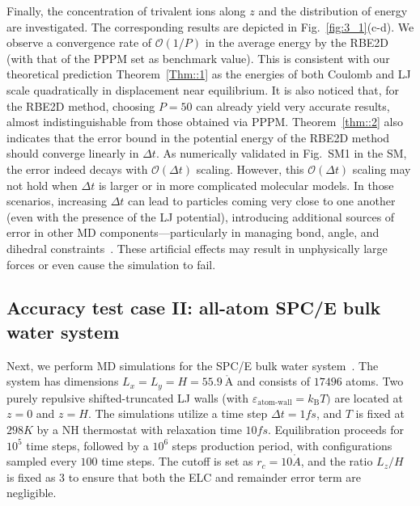 Finally, the concentration of trivalent ions along $z$ and the distribution of energy are investigated.
The corresponding results are depicted in Fig.~\ref{fig:3_1}(c-d). 
We observe a convergence rate of $\mathcal{O}(1/P)$ in the average energy by the RBE2D (with that of the PPPM set as benchmark value). 
This is consistent with our theoretical prediction Theorem~\ref{Thm::1} as the energies of both Coulomb and LJ scale quadratically in displacement near equilibrium.
It is also noticed that, for the RBE2D method, choosing $P=50$ can already yield very accurate results, almost indistinguishable from those obtained via PPPM. 
 {Theorem~\ref{thm::2} also indicates that the error bound in the potential energy of the RBE2D method should converge linearly in $\Delta t$. As numerically validated in Fig.~SM1 in the SM, the error indeed decays with $\mathcal{O}(\Delta t)$ scaling. However, this $\mathcal{O}(\Delta t)$ scaling may not hold when $\Delta t$ is larger or in more complicated molecular models. In those scenarios, increasing \(\Delta t\) can lead to particles coming very close to one another (even with the presence of the LJ potential), introducing additional sources of error in other MD components—particularly in managing bond, angle, and dihedral constraints~\cite{frenkel2023understanding}. These artificial effects may result in unphysically large forces or even cause the simulation to fail.}

\subsection{Accuracy test case II: all-atom SPC/E bulk water system}
\label{sec::waterhomo}

Next, we perform MD simulations for the SPC/E bulk water system~\cite{berendsen1987missing}. 
The system has dimensions $L_x=L_y=H=55.9~\mathring{\text{A}}$ and consists of $17496$ atoms. 
Two purely repulsive shifted-truncated LJ walls (with $\varepsilon_{\text{atom-wall}}= k_{\text{B}}T)$ are located at $z=0$ and $z=H$. 
The simulations utilize a time step $\Delta t=1fs$, and $T$ is fixed at $298K$ by a NH thermostat with relaxation time $10fs$. 
Equilibration proceeds for $10^5$ time steps, followed by a $10^6$ steps production period, with configurations sampled every $100$ time steps. 
The cutoff is set as $r_c=10\mathring{A}$, and the ratio $L_z/H$ is fixed as $3$ to ensure that both the ELC and remainder error term are negligible.

